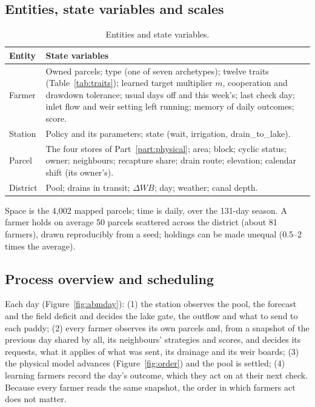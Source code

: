 \documentclass[11pt]{article}
\begin{document}
\subsection{Entities, state variables and scales}
\begin{table}[H]
\centering\small
\begin{tabular}{L{2.6cm}L{12.4cm}}
\toprule
\textbf{Entity} & \textbf{State variables} \\ \midrule
Farmer & Owned parcels; type (one of seven archetypes); twelve traits (Table~\ref{tab:traits}); learned target multiplier $m$, cooperation and drawdown tolerance; usual days off and this week's; last check day; inlet flow and weir setting left running; memory of daily outcomes; score. \\
Station & Policy and its parameters; state (\textsf{wait}, \textsf{irrigation}, \textsf{drain\_to\_lake}). \\
Parcel & The four stores of Part~\ref{part:physical}; area; block; cyclic status; owner; neighbours; recapture share; drain route; elevation; calendar shift (its owner's). \\
District & Pool; drains in transit; $\Delta WB$; day; weather; canal depth. \\
\bottomrule
\end{tabular}
\caption{Entities and state variables.}
\label{tab:entities}
\end{table}
Space is the 4,002 mapped parcels; time is daily, over the 131-day season. A farmer holds on average 50 parcels scattered across the district (about 81 farmers), drawn reproducibly from a seed; holdings can be made unequal (0.5--2 times the average).

\subsection{Process overview and scheduling}
Each day (Figure~\ref{fig:abmday}): (1) the station observes the pool, the forecast and the field deficit and decides the lake gate, the outflow and what to send to each paddy; (2) every farmer observes its own parcels and, from a snapshot of the previous day shared by all, its neighbours' strategies and scores, and decides its requests, what it applies of what was sent, its drainage and its weir boards; (3) the physical model advances (Figure~\ref{fig:order}) and the pool is settled; (4) learning farmers record the day's outcome, which they act on at their next check. Because every farmer reads the same snapshot, the order in which farmers act does not matter.
\end{document}
